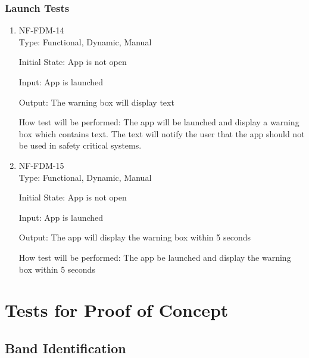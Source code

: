 \documentclass[12pt, titlepage]{article}
\begin{document}
\subsubsection{Launch Tests}
\begin{enumerate}
\item{NF-FDM-14\\}
Type: Functional, Dynamic, Manual
					
Initial State: 
App is not open
					
Input: 
App is launched
					
Output: 
The warning box will display text
					
How test will be performed: 
The app will be launched and display a warning box which contains text. The text will notify the user that the app should not be used in safety critical systems.

\item{NF-FDM-15\\}
Type: Functional, Dynamic, Manual
					
Initial State: 
App is not open
					
Input: 
App is launched
					
Output: 
The app will display the warning box within 5 seconds
					
How test will be performed: 
The app be launched and display the warning box within 5 seconds


\end{enumerate}




\section{Tests for Proof of Concept}
\subsection{Band Identification}
		
\end{document}

